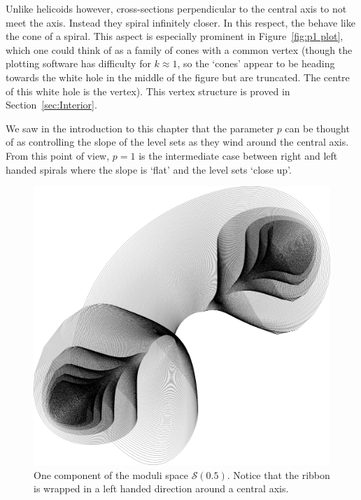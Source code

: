\documentclass{article}
\begin{document}
Unlike helicoids however, cross-sections perpendicular to the central axis to not meet the axis. Instead they spiral infinitely closer. In this respect, the behave like the cone of a spiral. This aspect is especially prominent in Figure~\ref{fig:p1 plot}, which one could think of as a family of cones with a common vertex (though the plotting software has difficulty for $k\approx 1$, so the `cones' appear to be heading towards the white hole in the middle of the figure but are truncated. The centre of this white hole is the vertex). This vertex structure is proved in Section~\ref{sec:Interior}. 

We saw in the introduction to this chapter that the parameter $p$ can be thought of as controlling the slope of the level sets as they wind around the central axis. From this point of view, $p=1$ is the intermediate case between right and left handed spirals where the slope is `flat' and the level sets `close up'.

\begin{figure}
    \includegraphics[width=\textwidth]{graphics/moduli_plot_p05.png}
    \caption{One component of the moduli space $\mathcal{S}(0.5)$. Notice that the ribbon is wrapped in a left handed direction around a central axis.}
    \label{fig:p05 plot}
\end{figure}
\end{document}
